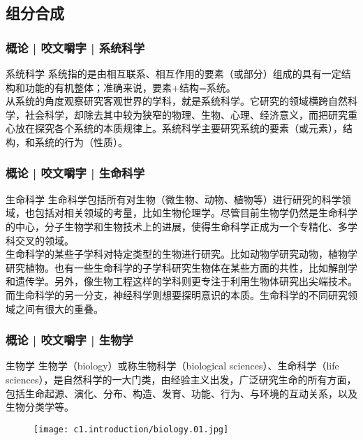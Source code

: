 \subsection{组分合成}
\begin{frame}
  \frametitle{概论 | 咬文嚼字 | 系统科学}
  \begin{block}{系统科学}
系统指的是由相互联系、相互作用的要素（或部分）组成的具有一定结构和功能的有机整体；准确来说，要素+结构=系统。\\
\vspace{1em}
从系统的角度观察研究客观世界的学科，就是系统科学。它研究的领域横跨自然科学，社会科学，却除去其中较为狭窄的物理、生物、心理、经济意义，而把研究重心放在探究各个系统的本质规律上。系统科学主要研究系统的要素（或元素），结构，和系统的行为（性质）。 
  \end{block}
\end{frame}

\begin{frame}
  \frametitle{概论 | 咬文嚼字 | 生命科学}
  \begin{block}{生命科学}
生命科学包括所有对生物（微生物、动物、植物等）进行研究的科学领域，也包括对相关领域的考量，比如生物伦理学。尽管目前生物学仍然是生命科学的中心，分子生物学和生物技术上的进展，使得生命科学正成为一个专精化、多学科交叉的领域。\\
    \vspace{1em}
生命科学的某些子学科对特定类型的生物进行研究。比如动物学研究动物，植物学研究植物。也有一些生命科学的子学科研究生物体在某些方面的共性，比如解剖学和遗传学。另外，像生物工程这样的学科则更专注于利用生物体研究出尖端技术。而生命科学的另一分支，神经科学则想要探明意识的本质。生命科学的不同研究领域之间有很大的重叠。\\
  \end{block}
\end{frame}

\begin{frame}
  \frametitle{概论 | 咬文嚼字 | 生物学}
  \begin{block}{生物学}
   生物学（biology）或称生物科学（biological sciences）、生命科学（life sciences），是自然科学的一大门类，由经验主义出发，广泛研究生命的所有方面，包括生命起源、演化、分布、构造、发育、功能、行为、与环境的互动关系，以及生物分类学等。\\
  \end{block}
  \begin{figure}
    \centering
    \texttt{[image: c1.introduction/biology.01.jpg]}
  \end{figure}
\end{frame}

